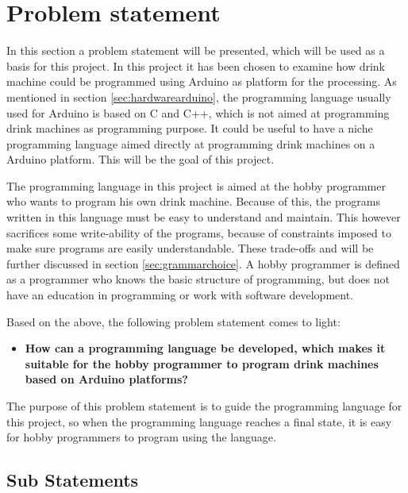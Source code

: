\section{Problem statement}
\label{sec:problemstatement}
In this section a problem statement will be presented, which will be used as a basis for this project. In this project it has been chosen to examine how drink machine could be programmed using Arduino as platform for the processing. As mentioned in section \ref{sec:hardwarearduino}, the programming language usually used for Arduino is based on C and C++, which is not aimed at programming drink machines as programming purpose. It could be useful to have a niche programming language aimed directly at programming drink machines on a Arduino platform. This will be the goal of this project.

The programming language in this project is aimed at the hobby programmer who wants to program his own drink machine. Because of this, the programs written in this language must be easy to understand and maintain. This however sacrifices some write-ability of the programs, because of constraints imposed to make sure programs are easily understandable. These trade-offs and will be further discussed in section \ref{sec:grammarchoice}. A hobby programmer is defined as a programmer who knows the basic structure of programming, but does not have an education in programming or work with software development.

Based on the above, the following problem statement comes to light:
\begin{itemize}
	\item \textbf{How can a programming language be developed, which makes it suitable for the hobby programmer to program drink machines based on Arduino platforms?}
\end{itemize}
The purpose of this problem statement is to guide the programming language for this project, so when the programming language reaches a final state, it is easy for hobby programmers to program using the language. 

\subsection{Sub Statements}

